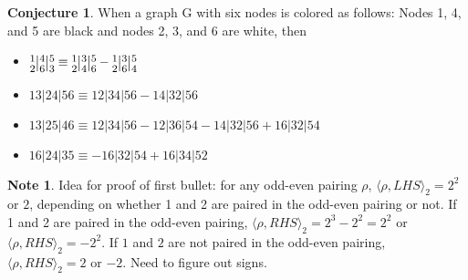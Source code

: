 \documentclass[11pt]{amsart}
\theoremstyle{definition}
\newtheorem*{conj*}{Conjecture}
\newtheorem*{note*}{Note}
\begin{document}
\begin{conj*}
When a graph G with six nodes is colored as follows: Nodes 1, 4, and 5 are black and nodes 2, 3, and 6 are white, then
\begin{itemize}
\item $\footnotesize{\stackanchor{1}{2} } \big{|} \footnotesize{\stackanchor{4}{6} } \big{|} \footnotesize{\stackanchor{5}{3} } \equiv
\footnotesize{\stackanchor{1}{2} } \big{|} \footnotesize{\stackanchor{3}{4} } \big{|} \footnotesize{\stackanchor{5}{6} }  -  
\footnotesize{\stackanchor{1}{2} } \big{|} \footnotesize{\stackanchor{3}{6} } \big{|} \footnotesize{\stackanchor{5}{4} } $
\item $13| 24 | 56 \equiv 12|34|56 - 14|32|56$
\item $13 | 25 | 46 \equiv 12| 34 | 56 - 12| 36 | 54 - 14| 32 | 56 + 16 | 32 | 54$
\item $16 | 24 | 35 \equiv - 16| 32 | 54 + 16 | 34 | 52$
\end{itemize}
\end{conj*}

\begin{note*}
Idea for proof of first bullet: for any odd-even pairing $\rho$, $\langle \rho, LHS \rangle_{2} = 2^2$ or $2$, depending on whether 1 and 2 are paired in the odd-even pairing or not. If 1 and 2 are paired in the odd-even pairing, $\langle \rho, RHS \rangle_{2} = 2^3 - 2^2 = 2^2$ or $\langle \rho, RHS \rangle_{2} = -2^2$. If $1$ and $2$ are not paired in the odd-even pairing, $\langle \rho, RHS \rangle_{2} = 2$ or $-2$. Need to figure out signs. 
\end{note*}
\end{document}

